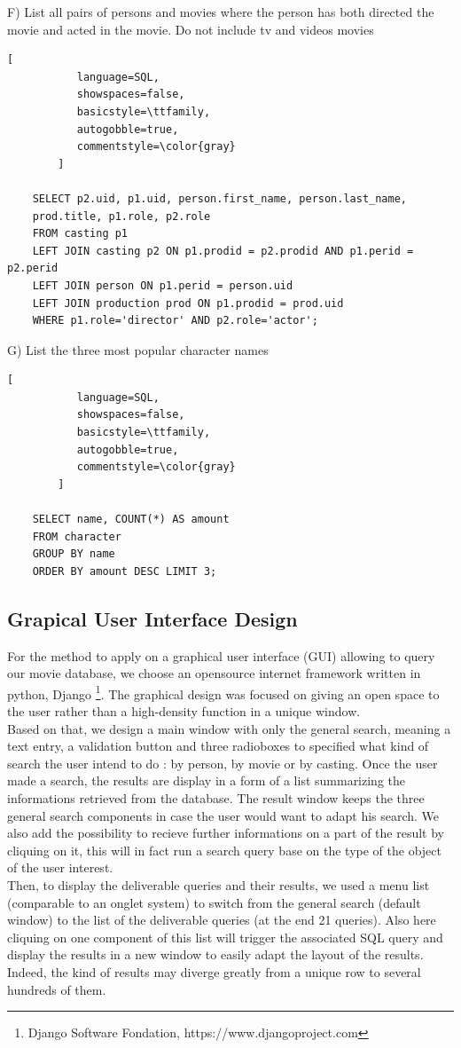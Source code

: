 \documentclass{article}
\begin{document}
F) List all pairs of persons and movies where the person has both directed the movie and acted in the movie. Do not include tv and videos movies
    \begin{lstlisting}[
           language=SQL,
           showspaces=false,
           basicstyle=\ttfamily,
           autogobble=true,
           commentstyle=\color{gray}
        ]
        
    SELECT p2.uid, p1.uid, person.first_name, person.last_name, 
    prod.title, p1.role, p2.role 
    FROM casting p1
    LEFT JOIN casting p2 ON p1.prodid = p2.prodid AND p1.perid = p2.perid
    LEFT JOIN person ON p1.perid = person.uid
    LEFT JOIN production prod ON p1.prodid = prod.uid
    WHERE p1.role='director' AND p2.role='actor';
    \end{lstlisting}
\medskip

G) List the three most popular character names
    \begin{lstlisting}[
           language=SQL,
           showspaces=false,
           basicstyle=\ttfamily,
           autogobble=true,
           commentstyle=\color{gray}
        ]
        
    SELECT name, COUNT(*) AS amount
    FROM character
    GROUP BY name
    ORDER BY amount DESC LIMIT 3;
    \end{lstlisting}
\medskip

\subsection{Grapical User Interface Design}

For the method to apply on a graphical user interface (GUI) allowing to query our movie database, we choose an opensource internet framework written in python, Django \footnote{Django Software Fondation, https://www.djangoproject.com}. The graphical design was focused on giving an open space to the user rather than a high-density function in a unique window.\\

Based on that, we design a main window with only the general search, meaning a text entry, a validation button and three radioboxes to specified what kind of search the user intend to do : by person, by movie or by casting. Once the user made a search, the results are display in a form of a list summarizing the informations retrieved from the database. The result window keeps the three general search components in case the user would want to adapt his search. We also add the possibility to recieve further informations on a part of the result by cliquing on it, this will in fact run a search query base on the type of the object of the user interest.\\

Then, to display the deliverable queries and their results, we used a menu list (comparable to an onglet system) to switch from the general search (default window) to the list of the deliverable queries (at the end 21 queries). Also here cliquing on one component of this list will trigger the associated SQL query and display the results in a new window to easily adapt the layout of the results. Indeed, the kind of results may diverge greatly from a unique row to several hundreds of them.
\end{document}
